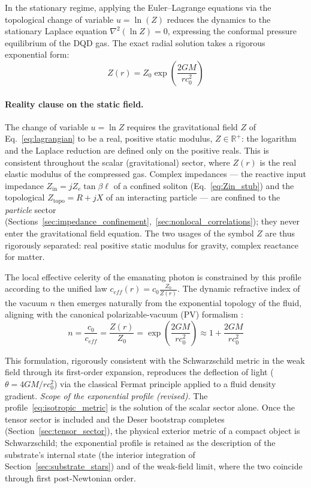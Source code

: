 \documentclass[11pt,a4paper]{article}
\theoremstyle{plain}
\theoremstyle{remark}
\begin{document}
In the stationary regime, applying the Euler--Lagrange equations via the topological change of variable $u = \ln(Z)$ reduces the dynamics to the stationary Laplace equation $\nabla^2(\ln Z) = 0$, expressing the conformal pressure equilibrium of the DQD gas. The exact radial solution takes a rigorous exponential form:
\begin{equation}
Z(r) = Z_0 \exp\left( \frac{2GM}{r c_0^2} \right)
\end{equation}

\paragraph{Reality clause on the static field.} The change of variable $u = \ln Z$ requires the gravitational field $Z$ of Eq.~\eqref{eq:lagrangian} to be a real, positive static modulus, $Z \in \mathbb{R}^+$: the logarithm and the Laplace reduction are defined only on the positive reals. This is consistent throughout the scalar (gravitational) sector, where $Z(r)$ is the real elastic modulus of the compressed gas. Complex impedances --- the reactive input impedance $Z_{\text{in}} = jZ_e\tan\beta\ell$ of a confined soliton (Eq.~\ref{eq:Zin_stub}) and the topological $Z_{\text{topo}} = R + jX$ of an interacting particle --- are confined to the \emph{particle} sector (Sections~\ref{sec:impedance_confinement},~\ref{sec:nonlocal_correlations}); they never enter the gravitational field equation. The two usages of the symbol $Z$ are thus rigorously separated: real positive static modulus for gravity, complex reactance for matter.

The local effective celerity of the emanating photon is constrained by this profile according to the unified law $c_{eff}(r) = c_0 \frac{Z_0}{Z(r)}$. The dynamic refractive index of the vacuum $n$ then emerges naturally from the exponential topology of the fluid, aligning with the canonical polarizable-vacuum (PV) formalism \cite{puthoff2002}:
\begin{equation}
n = \frac{c_0}{c_{eff}} = \frac{Z(r)}{Z_0} = \exp\left( \frac{2GM}{r c_0^2} \right) \approx 1 + \frac{2GM}{r c_0^2}
\end{equation}

This formulation, rigorously consistent with the Schwarzschild metric in the weak field through its first-order expansion, reproduces the deflection of light ($\theta = 4GM/rc_0^2$) via the classical Fermat principle applied to a fluid density gradient. \emph{Scope of the exponential profile (revised).} The profile~\eqref{eq:isotropic_metric} is the solution of the scalar sector alone. Once the tensor sector is included and the Deser bootstrap completes (Section~\ref{sec:tensor_sector}), the physical exterior metric of a compact object is Schwarzschild; the exponential profile is retained as the description of the substrate's internal state (the interior integration of Section~\ref{sec:substrate_stars}) and of the weak-field limit, where the two coincide through first post-Newtonian order.
\end{document}
